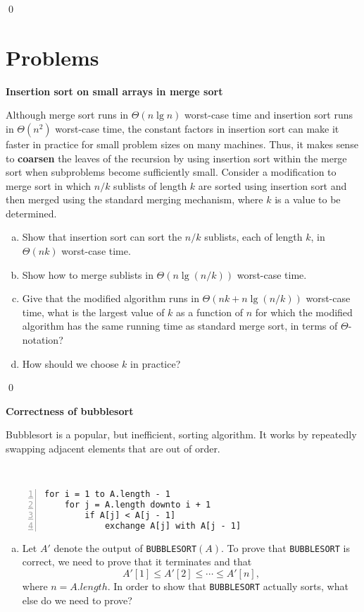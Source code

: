 \sol \qed

\section{Problems}

 \textbf{Insertion sort on small arrays in merge sort}

Although merge sort runs in $\Theta(n \lg n)$ worst-case time and insertion sort runs in $\Theta(n^2)$ worst-case time, the constant factors in insertion sort can make it faster in practice for small problem sizes on many machines. Thus, it makes sense to \textbf{coarsen} the leaves of the recursion by using insertion sort within the merge sort when subproblems become sufficiently small. Consider a modification to merge sort in which $n/k$ sublists of length $k$ are sorted using insertion sort and then merged using the standard merging mechanism, where $k$ is a value to be determined.

\begin{enumerate}[(a)]
    \item Show that insertion sort can sort the $n/k$ sublists, each of length $k$, in $\Theta(nk)$ worst-case time.
    \item Show how to merge sublists in $\Theta(n \lg(n/k))$ worst-case time.
    \item Give that the modified algorithm runs in $\Theta(nk + n\lg(n/k))$ worst-case time, what is the largest value of $k$ as a function of $n$ for which the modified algorithm has the same running time as standard merge sort, in terms of $\Theta$-notation?
    \item How should we choose $k$ in practice?
\end{enumerate}

\sol \qed

 \textbf{Correctness of bubblesort}

Bubblesort is a popular, but inefficient, sorting algorithm. It works by repeatedly swapping adjacent elements that are out of order.

\,

\begin{Verbatim}[frame=single,numbers=left,samepage=true,label={BUBBLESORT(A)}]
for i = 1 to A.length - 1
    for j = A.length downto i + 1
        if A[j] < A[j - 1]
            exchange A[j] with A[j - 1]
\end{Verbatim}

\begin{enumerate}[(a)]
    \item Let $A'$ denote the output of \verb|BUBBLESORT|$(A)$. To prove that \verb|BUBBLESORT| is correct, we need to prove that it terminates and that \begin{equation}A'[1] \leq A'[2] \leq \cdots \leq A'[n],\end{equation} where $n = A.length$. In order to show that \verb|BUBBLESORT| actually sorts, what else do we need to prove?
\end{enumerate}

